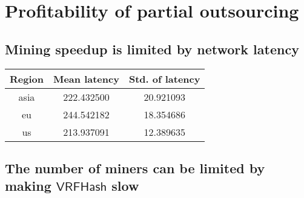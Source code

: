 \section{Profitability of partial outsourcing}
\label{sec:partial-outsourcing}

\subsection{Mining speedup is limited by network latency}

\begin{table}
    \centering
    \begin{tabular}{|c|c|c|}
        \hline
        Region     & Mean latency & Std. of latency \\\hline
        asia   & 222.432500    & 20.921093    \\\hline
        eu     & 244.542182    & 18.354686    \\\hline
        us     & 213.937091    & 12.389635    \\\hline
    \end{tabular}
\end{table}





\subsection{The number of miners can be limited by making $\mathsf{VRFHash}$ slow}